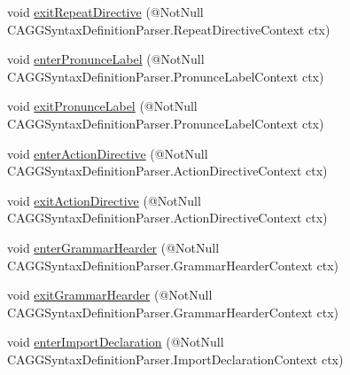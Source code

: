\begin{DoxyCompactItemize}
\item 
void \hyperlink{interfaceit_1_1emarolab_1_1cagg_1_1core_1_1language_1_1parser_1_1ANTLRInterface_1_1ANTLRGenerate8f089aac366bd2683be460c907cc6185_a383da59f2ca3066af35a3868097d809f}{exit\-Repeat\-Directive} (@Not\-Null C\-A\-G\-G\-Syntax\-Definition\-Parser.\-Repeat\-Directive\-Context ctx)
\item 
void \hyperlink{interfaceit_1_1emarolab_1_1cagg_1_1core_1_1language_1_1parser_1_1ANTLRInterface_1_1ANTLRGenerate8f089aac366bd2683be460c907cc6185_a4d6a14f9b06c1efc3681d42e89c0c787}{enter\-Pronunce\-Label} (@Not\-Null C\-A\-G\-G\-Syntax\-Definition\-Parser.\-Pronunce\-Label\-Context ctx)
\item 
void \hyperlink{interfaceit_1_1emarolab_1_1cagg_1_1core_1_1language_1_1parser_1_1ANTLRInterface_1_1ANTLRGenerate8f089aac366bd2683be460c907cc6185_ab1dd24a7137e10026ed00c9d6dd3fda1}{exit\-Pronunce\-Label} (@Not\-Null C\-A\-G\-G\-Syntax\-Definition\-Parser.\-Pronunce\-Label\-Context ctx)
\item 
void \hyperlink{interfaceit_1_1emarolab_1_1cagg_1_1core_1_1language_1_1parser_1_1ANTLRInterface_1_1ANTLRGenerate8f089aac366bd2683be460c907cc6185_a0e3a79200250aff964af043755ea0596}{enter\-Action\-Directive} (@Not\-Null C\-A\-G\-G\-Syntax\-Definition\-Parser.\-Action\-Directive\-Context ctx)
\item 
void \hyperlink{interfaceit_1_1emarolab_1_1cagg_1_1core_1_1language_1_1parser_1_1ANTLRInterface_1_1ANTLRGenerate8f089aac366bd2683be460c907cc6185_a0240277a8b30b4298011ffc093fa2354}{exit\-Action\-Directive} (@Not\-Null C\-A\-G\-G\-Syntax\-Definition\-Parser.\-Action\-Directive\-Context ctx)
\item 
void \hyperlink{interfaceit_1_1emarolab_1_1cagg_1_1core_1_1language_1_1parser_1_1ANTLRInterface_1_1ANTLRGenerate8f089aac366bd2683be460c907cc6185_a2de8cb0e0bc2c6710cc0a17fd643987d}{enter\-Grammar\-Hearder} (@Not\-Null C\-A\-G\-G\-Syntax\-Definition\-Parser.\-Grammar\-Hearder\-Context ctx)
\item 
void \hyperlink{interfaceit_1_1emarolab_1_1cagg_1_1core_1_1language_1_1parser_1_1ANTLRInterface_1_1ANTLRGenerate8f089aac366bd2683be460c907cc6185_a814b7c513f88a2269d38d1ef7b832122}{exit\-Grammar\-Hearder} (@Not\-Null C\-A\-G\-G\-Syntax\-Definition\-Parser.\-Grammar\-Hearder\-Context ctx)
\item 
void \hyperlink{interfaceit_1_1emarolab_1_1cagg_1_1core_1_1language_1_1parser_1_1ANTLRInterface_1_1ANTLRGenerate8f089aac366bd2683be460c907cc6185_a69bfd3bee0207c15553b172ff7eeff77}{enter\-Import\-Declaration} (@Not\-Null C\-A\-G\-G\-Syntax\-Definition\-Parser.\-Import\-Declaration\-Context ctx)

\end{DoxyCompactItemize}
